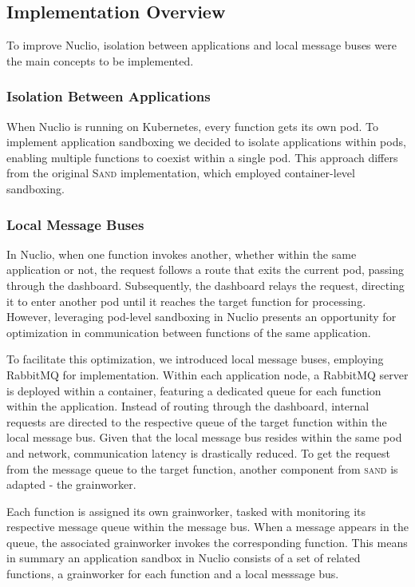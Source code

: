 \subsection{Implementation Overview}
To improve Nuclio, isolation between applications and local message buses were the main concepts to be implemented.

\subsubsection{Isolation Between Applications}
When Nuclio is running on Kubernetes, every function gets its own pod. To implement
application sandboxing we decided to isolate applications within pods, enabling multiple
functions to coexist within a single pod. This approach differs from the original
\textsc{Sand} implementation, which employed container-level sandboxing.  



\subsubsection{Local Message Buses}
In Nuclio, when one function invokes another, whether within the same application or not,
the request follows a route that exits the current pod, passing through the dashboard.
Subsequently, the dashboard relays the request, directing it to enter another pod until
it reaches the target function for processing. However, leveraging pod-level sandboxing
in Nuclio presents an opportunity for optimization in communication between functions
of the same application.

To facilitate this optimization, we introduced local message buses, employing RabbitMQ
for implementation. Within each application node, a RabbitMQ server is deployed within
a container, featuring a dedicated queue for each function within the application. 
Instead of routing through the dashboard, internal requests are directed to the respective
queue of the target function within the local message bus. Given that the local message
bus resides within the same pod and network, communication latency is drastically reduced. 
To get the request from the message queue to the target function, another component from
\textsc{sand} is adapted - the grainworker.

Each function is assigned its own grainworker, tasked with monitoring its respective message
queue within the message bus. When a message appears in the queue, the associated grainworker
invokes the corresponding function. This means in summary an application sandbox in Nuclio
consists of a set of related functions, a grainworker for each function and a local messsage bus.




\cite{akkus2018sand}